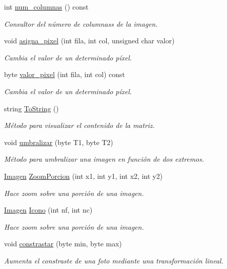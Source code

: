 \begin{DoxyCompactItemize}
int \hyperlink{classImagen_ac28d55c18064aea2a65e6fcf51d86191}{num\+\_\+columnas} () const
\begin{DoxyCompactList}\small\item\em Consultor del número de columnass de la imagen. \end{DoxyCompactList}\item 
void \hyperlink{classImagen_abe7e36244d80a6ed5ebf952c557203d3}{asigna\+\_\+pixel} (int fila, int col, unsigned char valor)
\begin{DoxyCompactList}\small\item\em Cambia el valor de un determinado píxel. \end{DoxyCompactList}\item 
byte \hyperlink{classImagen_a7d9378695a7fd2dce8092f180e716229}{valor\+\_\+pixel} (int fila, int col) const
\begin{DoxyCompactList}\small\item\em Cambia el valor de un determinado píxel. \end{DoxyCompactList}\item 
string \hyperlink{classImagen_a258fbb5b40592cc96bcdf6ddda578b8d}{To\+String} ()
\begin{DoxyCompactList}\small\item\em Método para visualizar el contenido de la matriz. \end{DoxyCompactList}\item 
void \hyperlink{classImagen_a662dc0df56563c90691f17101308fcd2}{umbralizar} (byte T1, byte T2)
\begin{DoxyCompactList}\small\item\em Método para umbralizar una imagen en función de dos extremos. \end{DoxyCompactList}\item 
\hyperlink{classImagen}{Imagen} \hyperlink{classImagen_a5f5af297229cd4dd7878d3cabdfda7b2}{Zoom\+Porcion} (int x1, int y1, int x2, int y2)
\begin{DoxyCompactList}\small\item\em Hace zoom sobre una porción de una imagen. \end{DoxyCompactList}\item 
\hyperlink{classImagen}{Imagen} \hyperlink{classImagen_abd0add1ed131388d72d46446bdfb594c}{Icono} (int nf, int nc)
\begin{DoxyCompactList}\small\item\em Hace zoom sobre una porción de una imagen. \end{DoxyCompactList}\item 
void \hyperlink{classImagen_ab32cdcc580797003ba6d1cf0a8affd9a}{constrastar} (byte min, byte max)
\begin{DoxyCompactList}\small\item\em Aumenta el constraste de una foto mediante una transformación lineal. \end{DoxyCompactList}\end{DoxyCompactItemize}


